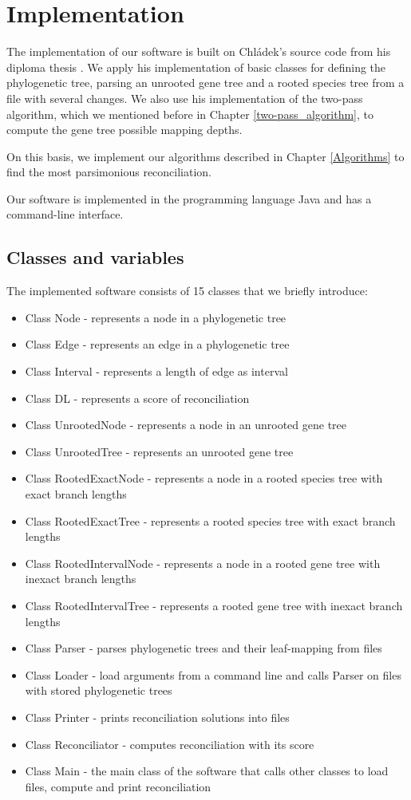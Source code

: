 \chapter{Implementation} \label{Implementation}

The implementation of our software is built on Chládek's source code from his diploma thesis \cite{chladek_thesis}. We apply his implementation of basic classes for defining the phylogenetic tree, parsing an unrooted gene tree and a rooted species tree from a file with several changes. We also use his implementation of the two-pass algorithm, which we mentioned before in Chapter \ref{two-pass_algorithm}, to compute the gene tree possible mapping depths.

On this basis, we implement our algorithms described in Chapter \ref{Algorithms} to find the most parsimonious reconciliation.

Our software is implemented in the programming language Java and has a command-line interface.

\section{Classes and variables}
The implemented software consists of 15 classes that we briefly introduce:
\begin{itemize}
  \item Class Node - represents a node in a phylogenetic tree
  \item Class Edge - represents an edge in a phylogenetic tree
  \item Class Interval - represents a length of edge as interval
  \item Class DL - represents a score of reconciliation
  \item Class UnrootedNode - represents a node in an unrooted gene tree
  \item Class UnrootedTree - represents an unrooted gene tree
  \item Class RootedExactNode - represents a node in a rooted species tree with exact branch lengths
  \item Class RootedExactTree - represents a rooted species tree with exact branch lengths
  \item Class RootedIntervalNode - represents a node in a rooted gene tree with inexact branch lengths
  \item Class RootedIntervalTree - represents a rooted gene tree with inexact branch lengths
  \item Class Parser - parses phylogenetic trees and their leaf-mapping from files
  \item Class Loader - load arguments from a command line and calls Parser on files with stored phylogenetic trees
  \item Class Printer - prints reconciliation solutions into files
  \item Class Reconciliator - computes reconciliation with its score
  \item Class Main - the main class of the software that calls other classes to load files, compute and print reconciliation
\end{itemize}

